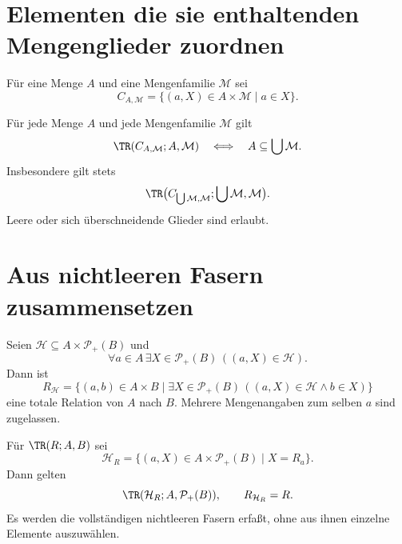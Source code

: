 \section{Elementen die sie enthaltenden Mengenglieder zuordnen}

\begin{definition}
Für eine Menge $A$ und eine Mengenfamilie $\mathcal M$ sei
\[
 C_{A,\mathcal M}
  =\{(a,X)\in A\times\mathcal M\mid a\in X\}.
\]
\end{definition}

\begin{theorem}[Überdeckungskriterium]
\label{b04guide:thm:cover}
Für jede Menge $A$ und jede Mengenfamilie $\mathcal M$ gilt
\[
 \TR(C_{A,\mathcal M};A,\mathcal M)
 \quad\Longleftrightarrow\quad
 A\subseteq\bigcup\mathcal M.
\]
Insbesondere gilt stets
\[
 \TR\bigl(C_{\bigcup\mathcal M,\mathcal M};
                        \bigcup\mathcal M,\mathcal M\bigr).
\]
Leere oder sich überschneidende Glieder sind erlaubt.
\end{theorem}

\section{Aus nichtleeren Fasern zusammensetzen}

\begin{theorem}
\label{b04guide:thm:fiberdata}
Seien $\mathcal H\subseteq A\times\mathcal P_+(B)$ und
\[
 \forall a\in A\,\exists X\in\mathcal P_+(B)\,
                                      ((a,X)\in\mathcal H).
\]
Dann ist
\[
 R_{\mathcal H}
  =\{(a,b)\in A\times B\mid
         \exists X\in\mathcal P_+(B)\,
                    ((a,X)\in\mathcal H\land b\in X)\}
\]
eine totale Relation von $A$ nach $B$.
Mehrere Mengenangaben zum selben $a$ sind zugelassen.
\end{theorem}

\begin{theorem}
\label{b04guide:thm:representation}
Für $\TR(R;A,B)$ sei
\[
 \mathcal H_R=
 \{(a,X)\in A\times\mathcal P_+(B)\mid X=R_a\}.
\]
Dann gelten
\[
 \TR(\mathcal H_R;A,\mathcal P_+(B)),
 \qquad R_{\mathcal H_R}=R.
\]
Es werden die vollständigen nichtleeren Fasern erfaßt,
ohne aus ihnen einzelne Elemente auszuwählen.
\end{theorem}
